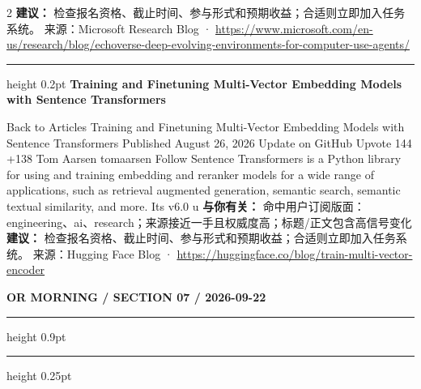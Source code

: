\documentclass[10.5pt]{ctexart}
\begin{document}
\begin{multicols}{2}
\textbf{建议：} 检查报名资格、截止时间、参与形式和预期收益；合适则立即加入任务系统。
{\footnotesize\color{ormuted} 来源：Microsoft Research Blog · \url{https://www.microsoft.com/en-us/research/blog/echoverse-deep-evolving-environments-for-computer-use-agents/}}
\vspace{2mm}
\hrule height 0.2pt
\vspace{2mm}
{\large\bfseries Training and Finetuning Multi-Vector Embedding Models with Sentence Transformers}\par
Back to Articles Training and Finetuning Multi-Vector Embedding Models with Sentence Transformers Published August 26, 2026 Update on GitHub Upvote 144 +138 Tom Aarsen tomaarsen Follow Sentence Transformers is a Python library for using and training embedding and reranker models for a wide range of applications, such as retrieval augmented generation, semantic search, semantic textual similarity, and more. Its v6.0 u
\textbf{与你有关：} 命中用户订阅版面：engineering、ai、research；来源接近一手且权威度高；标题/正文包含高信号变化
\textbf{建议：} 检查报名资格、截止时间、参与形式和预期收益；合适则立即加入任务系统。
{\footnotesize\color{ormuted} 来源：Hugging Face Blog · \url{https://huggingface.co/blog/train-multi-vector-encoder}}
\end{multicols}
\newpage
{\small\bfseries OR MORNING / SECTION 07 / 2026-09-22}
\vspace{2mm}
\hrule height 0.9pt
\vspace{1.5mm}
\hrule height 0.25pt
\vspace{4mm}
\end{document}
